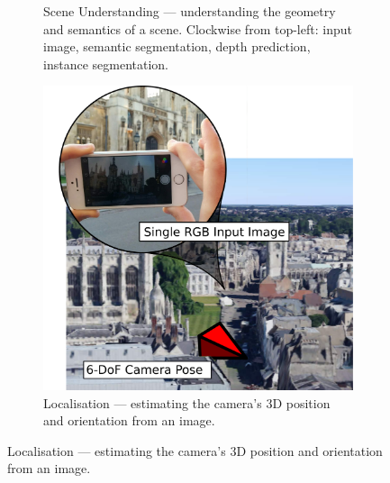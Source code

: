 \begin{figure}[t]
\begin{subfigure}[b]{0.65\textwidth}
        \caption{Scene Understanding --- understanding the geometry and semantics of a scene. Clockwise from top-left: input image, semantic segmentation, depth prediction, instance segmentation.}
    \end{subfigure}
    \quad
    \begin{subfigure}[b]{0.3\textwidth}
\centering
        \includegraphics[width=\textwidth]{teaser.pdf}
        \caption{Localisation --- estimating the camera's 3D position and orientation from an image.}
    \end{subfigure}
    

\end{figure}
